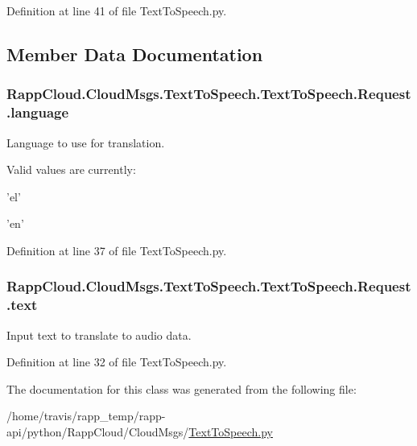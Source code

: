 Definition at line 41 of file Text\-To\-Speech.\-py.



\subsection{Member Data Documentation}
\hypertarget{classRappCloud_1_1CloudMsgs_1_1TextToSpeech_1_1TextToSpeech_1_1Request_aa461223e16c93201336a4ef5f3196094}{
\subsubsection[{language}]{\setlength{\rightskip}{0pt plus 5cm}Rapp\-Cloud.\-Cloud\-Msgs.\-Text\-To\-Speech.\-Text\-To\-Speech.\-Request.\-language}}\label{classRappCloud_1_1CloudMsgs_1_1TextToSpeech_1_1TextToSpeech_1_1Request_aa461223e16c93201336a4ef5f3196094}


Language to use for translation. 

Valid values are currently\-:
\begin{DoxyItemize}
\item 'el'
\item 'en' 
\end{DoxyItemize}

Definition at line 37 of file Text\-To\-Speech.\-py.

\hypertarget{classRappCloud_1_1CloudMsgs_1_1TextToSpeech_1_1TextToSpeech_1_1Request_a527e571b5f803415a6cd5f4a8606ea3b}{
\subsubsection[{text}]{\setlength{\rightskip}{0pt plus 5cm}Rapp\-Cloud.\-Cloud\-Msgs.\-Text\-To\-Speech.\-Text\-To\-Speech.\-Request.\-text}}\label{classRappCloud_1_1CloudMsgs_1_1TextToSpeech_1_1TextToSpeech_1_1Request_a527e571b5f803415a6cd5f4a8606ea3b}


Input text to translate to audio data. 



Definition at line 32 of file Text\-To\-Speech.\-py.



The documentation for this class was generated from the following file\-:\begin{DoxyCompactItemize}
\item 
/home/travis/rapp\-\_\-temp/rapp-\/api/python/\-Rapp\-Cloud/\-Cloud\-Msgs/\hyperlink{TextToSpeech_8py}{Text\-To\-Speech.\-py}\end{DoxyCompactItemize}

